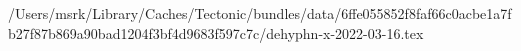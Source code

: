 /Users/msrk/Library/Caches/Tectonic/bundles/data/6ffe055852f8faf66c0acbe1a7fb27f87b869a90bad1204f3bf4d9683f597c7c/dehyphn-x-2022-03-16.tex